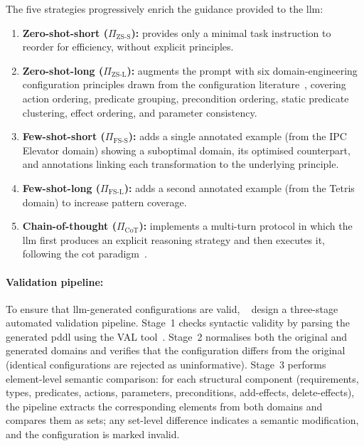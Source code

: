 The five strategies progressively enrich the guidance provided to the \gls{llm}:
\begin{enumerate}
  \item \textbf{Zero-shot-short ($\Pi_{\text{ZS-S}}$):} provides only a minimal task instruction to reorder for efficiency, without explicit principles.
  \item \textbf{Zero-shot-long ($\Pi_{\text{ZS-L}}$):} augments the prompt with six domain-engineering configuration principles drawn from the configuration literature~\cite{Vallati2021, Franco2019, FoxLong2003, Helmert2009, McCluskey2017}, covering action ordering, predicate grouping, precondition ordering, static predicate clustering, effect ordering, and parameter consistency.
  \item \textbf{Few-shot-short ($\Pi_{\text{FS-S}}$):} adds a single annotated example (from the IPC Elevator domain) showing a suboptimal domain, its optimised counterpart, and annotations linking each transformation to the underlying principle.
  \item \textbf{Few-shot-long ($\Pi_{\text{FS-L}}$):} adds a second annotated example (from the Tetris domain) to increase pattern coverage.
  \item \textbf{Chain-of-thought ($\Pi_{\text{CoT}}$):} implements a multi-turn protocol in which the \gls{llm} first produces an explicit reasoning strategy and then executes it, following the \gls{cot} paradigm~\cite{Wei2022}.
\end{enumerate}

\paragraph{Validation pipeline:}
To ensure that \gls{llm}-generated configurations are valid, \citeauthor{Georgievski2025}~\cite{Georgievski2025} design a three-stage automated validation pipeline.
Stage~1 checks syntactic validity by parsing the generated \gls{pddl} using the VAL tool~\cite{HoweyLongFox2004}.
Stage~2 normalises both the original and generated domains and verifies that the configuration differs from the original (identical configurations are rejected as uninformative).
Stage~3 performs element-level semantic comparison: for each structural component (requirements, types, predicates, actions, parameters, preconditions, add-effects, delete-effects), the pipeline extracts the corresponding elements from both domains and compares them as sets; any set-level difference indicates a semantic modification, and the configuration is marked invalid.

